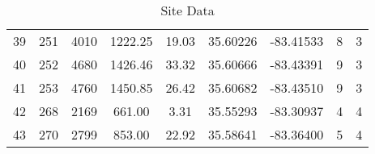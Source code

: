 \begin{table}[p]
\begin{flushleft}
\begin{tabular}{ccccccccc}
39 & 251                                                 & 4010                                                          & 1222.25                                                     & 19.03 & 35.60226 & -83.41533 & 8                                                                                      & 3 \\ 
40 & 252                                                 & 4680                                                          & 1426.46                                                     & 33.32 & 35.60666 & -83.43391 & 9                                                                                      & 3 \\ 
41 & 253                                                 & 4760                                                          & 1450.85                                                     & 26.42 & 35.60682 & -83.43510 & 9                                                                                      & 3 \\ 
42 & 268                                                 & 2169                                                          & 661.00                                                       & 3.31   & 35.55293 & -83.30937 & 4                                                                                      & 4 \\ 
43 & 270                                                 & 2799                                                          & 853.00                                                       & 22.92 & 35.58641 & -83.36400 & 5                                                                                      & 4 \\  
\bottomrule
\end{tabular}
\end{flushleft}
\caption{Site Data}
\label{tab:Site Data}
\end{table}